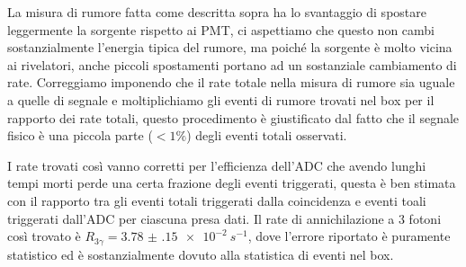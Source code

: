 La misura di rumore fatta come descritta sopra ha lo svantaggio di spostare leggermente la sorgente rispetto ai PMT, ci aspettiamo che questo non cambi sostanzialmente l'energia tipica del rumore, ma poiché la sorgente è molto vicina ai rivelatori, anche piccoli spostamenti portano ad un sostanziale cambiamento di rate. Correggiamo imponendo che il rate totale nella misura di rumore sia uguale a quelle di segnale e moltiplichiamo gli eventi di rumore trovati nel box per il rapporto dei rate totali, questo procedimento è giustificato dal fatto che il segnale fisico è una piccola parte ($< 1\%$) degli eventi totali osservati.

I rate trovati così vanno corretti per l'efficienza dell'ADC che avendo lunghi tempi morti perde una certa frazione degli eventi triggerati, questa è ben stimata con il rapporto tra gli eventi totali triggerati dalla coincidenza e eventi toali triggerati dall'ADC per ciascuna presa dati.
Il rate di annichilazione a 3 fotoni così trovato è $R_{3\gamma} = \SI{3.78(15)e-2}{s^{-1}}$, dove l'errore riportato è puramente statistico ed è sostanzialmente dovuto alla statistica di eventi nel box.

